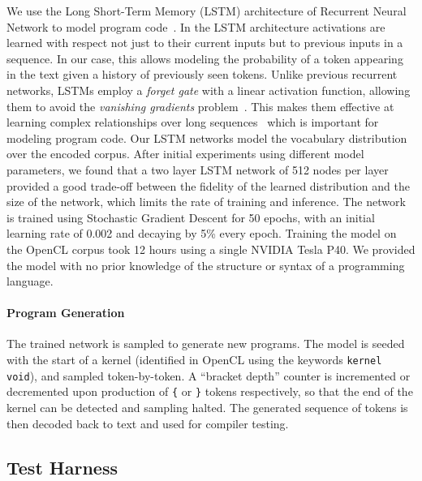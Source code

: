 We use the Long Short-Term Memory (LSTM) architecture of Recurrent Neural
Network to model program code~\cite{Hochreiter1997}. In the LSTM architecture
activations are learned with respect not just to their current inputs but to
previous inputs in a sequence. In our case, this allows modeling the probability
of a token appearing in the text given a history of previously seen tokens.
Unlike previous recurrent networks, LSTMs employ a \emph{forget gate} with a
linear activation function, allowing them to avoid the \emph{vanishing
gradients} problem~\cite{Pacanu2013}. This makes them effective at learning
complex relationships over long sequences~\cite{Lipton2015} which is important
for modeling program code. Our LSTM networks model the vocabulary distribution
over the encoded corpus. After initial experiments using different model
parameters, we found that a two layer LSTM network of 512 nodes per layer
provided a good trade-off between the fidelity of the learned distribution and
the size of the network, which limits the rate of training and inference. The
network is trained using Stochastic Gradient Descent for 50 epochs, with an
initial learning rate of 0.002 and decaying by 5\% every epoch. Training the
model on the OpenCL corpus took 12 hours using a single NVIDIA Tesla P40. We
provided the model with no prior knowledge of the structure or syntax of a
programming language.

\paragraph{Program Generation}

The trained network is sampled to generate new programs. The model is seeded
with the start of a kernel (identified in OpenCL using the keywords
\texttt{kernel void}), and sampled token-by-token. A ``bracket depth'' counter
is incremented or decremented upon production of \texttt{\{} or \texttt{\}}
tokens respectively, so that the end of the kernel can be detected and sampling
halted. The generated sequence of tokens is then decoded back to text and used
for compiler testing.


\subsection{Test Harness\label{sec:test-harness}}

\begin{table}[t!]
  \footnotesize %
  \centering %
  \caption{%
  OpenCL systems and the number of bug reports submitted to date (22\% of
  which have been fixed, the remainder are pending). For each system, two
  testbeds are created, one with compiler optimizations, the other without.%
  \vspace{-.8em}
  }
  
  \vspace{-.7em}
  \label{tab:platforms}
\end{table}


